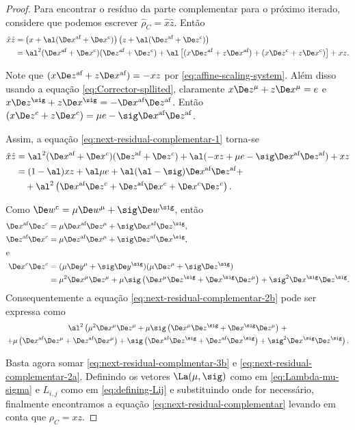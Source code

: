 \begin{proof} 
Para encontrar o resíduo da parte complementar para o próximo iterado,
considere que podemos escrever
 $\hat{\rho}_C  =
\hat{x}\hat{z}$. Então
\begin{align}
\hat{x}\hat{z} & = \left(x + \al(\dex + \Decox) \right)\left( z + \al(\dez + \Decoz
)\right) \notag \\
& = \al^2(\dex+\Decox)(\dez + \Decoz) +  \al\left[  (x\dez+z\dex) +
(x\Decoz + z\Decox)\right] + xz .\label{eq:next-residual-complementar-1}
\end{align}


Note que  $ (x\dez+z\dex) = -xz$ por \eqref{eq:affine-scaling-system}. Além
disso usando a equação \eqref{eq:Corrector-spllited}, claramente  $x\Dez^\mu +
z\Dex^\mu = e$ e $x\Dez^\sig + z\Dex^\sig = - \dex\dez$. Então $(x\Dez^c +
z\Dex^c) = \mu e - \sig\dex\dez$.
 
Assim, a equação \eqref{eq:next-residual-complementar-1} torna-se
\begin{subequations}
\begin{align}
\hat{x}\hat{z} & =  \al^2(\dex + \Dex^c)(\dez + \Dez^c) + \al (-xz + \mu   e
- \sig\dex\dez) + xz \notag\\
& = (1-\al) xz + \al\mu e +
\al(\al-\sig)\dex\dez    +
\label{eq:next-residual-complementar-2a} \\
& \quad + \al^2\left(\dex\Dez^c + \dez\Dex^c + \Dex^c\Dez^c\right).
\label{eq:next-residual-complementar-2b}
\end{align}
\end{subequations}

Como $\Decow = \mu\Dew^\mu + \sig\Dew^\sig$, então
\begin{align*}
\dex\Dez^c &=  \mu\dex\Dez^\mu + \sig\dex\Dez^\sig,\\
\dez\Dex^c &=  \mu\dez\Dex^\mu + \sig\dez\Dex^\sig,\\
\intertext{e}
\Dex^c\Dez^c& =   (\mu\Dey^\mu + \sig\Dey^\sig) (\mu\Dez^\mu
			+ \sig\Dez^\sig) \\ 
			& = \mu^2\Dex^\mu\Dez^\mu + \mu\sig \left(\Dex^\mu\Dez^\sig +
			\Dex^\sig\Dez^\mu \right) + \sig^2\Dex^\sig\Dez^\sig.
\end{align*}
Consequentemente a equação \eqref{eq:next-residual-complementar-2b} pode ser
expressa como
\begin{multline}
\label{eq:next-residual-complmentar-3b}
\al^2\left(\mu^2\Dex^\mu\Dez^\mu + \mu\sig \left(\Dex^\mu\Dez^\sig +
			\Dex^\sig\Dez^\mu \right) \right. +  \\ \left. + \mu\left(\dex\Dez^\mu +
			\dez\Dex^\mu \right) +   \sig\left(\dex\Dez^\sig + \dez\Dex^\sig\right) +
			\sig^2\Dex^\sig\Dez^\sig \right).
\end{multline}


Basta agora somar  \eqref{eq:next-residual-complmentar-3b}  e
 \eqref{eq:next-residual-complementar-2a}. Definindo os vetores
$\La(\mu,\sig)$ como em \eqref{eq:Lambda-mu-sigma} e $L_{i,j}$ como em
\eqref{eq:defining-Lij} e substituindo onde for necessário, finalmente
encontramos a equação \eqref{eq:next-residual-complementar} levando em conta que $\rho_C = xz$.
\end{proof} 


